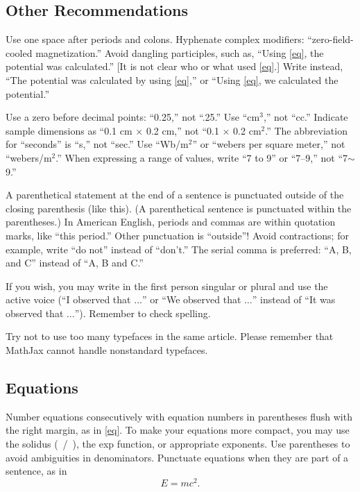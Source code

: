 \documentclass[journal,twoside,web]{ieeecolor}
\begin{document}
\subsection{Other Recommendations}
Use one space after periods and colons. Hyphenate complex modifiers: 
``zero-field-cooled magnetization.'' Avoid dangling participles, such as, 
``Using \eqref{eq}, the potential was calculated.'' [It is not clear who or what 
used \eqref{eq}.] Write instead, ``The potential was calculated by using \eqref{eq},'' or 
``Using \eqref{eq}, we calculated the potential.''

Use a zero before decimal points: ``0.25,'' not ``.25.'' Use 
``cm$^{3}$,'' not ``cc.'' Indicate sample dimensions as ``0.1 cm 
$\times $ 0.2 cm,'' not ``0.1 $\times $ 0.2 cm$^{2}$.'' The 
abbreviation for ``seconds'' is ``s,'' not ``sec.'' Use 
``Wb/m$^{2}$'' or ``webers per square meter,'' not 
``webers/m$^{2}$.'' When expressing a range of values, write ``7 to 
9'' or ``7--9,'' not ``7$\sim $9.''

A parenthetical statement at the end of a sentence is punctuated outside of 
the closing parenthesis (like this). (A parenthetical sentence is punctuated 
within the parentheses.) In American English, periods and commas are within 
quotation marks, like ``this period.'' Other punctuation is ``outside''! 
Avoid contractions; for example, write ``do not'' instead of ``don't.'' The 
serial comma is preferred: ``A, B, and C'' instead of ``A, B and C.''

If you wish, you may write in the first person singular or plural and use 
the active voice (``I observed that $\ldots$'' or ``We observed that $\ldots$'' 
instead of ``It was observed that $\ldots$''). Remember to check spelling. 


Try not to use too many typefaces in the same article. Please remember that MathJax
cannot handle nonstandard typefaces.

\subsection{Equations}
Number equations consecutively with equation numbers in parentheses flush 
with the right margin, as in \eqref{eq}. To make your equations more 
compact, you may use the solidus (~/~), the exp function, or appropriate 
exponents. Use parentheses to avoid ambiguities in denominators. Punctuate 
equations when they are part of a sentence, as in
\begin{equation}E=mc^2.\label{eq}\end{equation}
\end{document}
